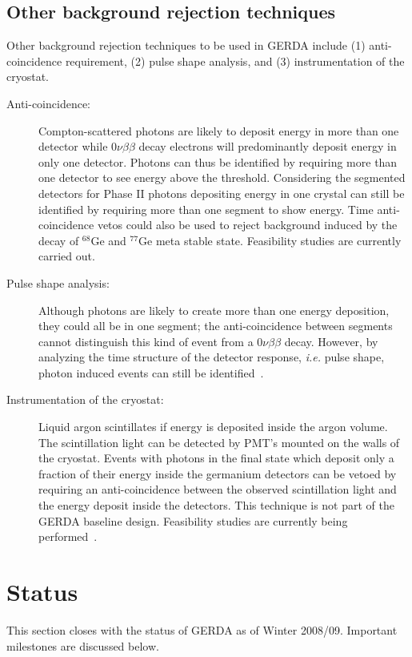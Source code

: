 \subsection{Other background rejection techniques}
\label{sec:gerda:anti}
Other background rejection techniques to be used in GERDA include (1) anti-coincidence requirement, (2) pulse shape analysis, and (3) instrumentation of the cryostat.
\begin{description}
\item[Anti-coincidence:] Compton-scattered photons are likely to   deposit energy in more than one detector while $0\nu\beta\beta$   decay electrons will predominantly deposit energy in only one   detector. Photons can thus be identified by requiring more than one   detector to see energy above the threshold. Considering the   segmented detectors for Phase II photons depositing energy in one   crystal can still be identified by requiring more than one segment   to show energy. Time anti-coincidence vetos could also be used to   reject background induced by the decay of $^{68}$Ge and $^{77}$Ge   meta stable state. Feasibility studies are currently carried out.
\item[Pulse shape analysis:] Although photons are likely to create   more than one energy deposition, they could all be in one segment;   the anti-coincidence between segments cannot distinguish this kind   of event from a $0\nu\beta\beta$ decay. However, by analyzing   the time structure of the detector response, \textit{i.e.} pulse   shape, photon induced events can still be identified~\cite{Kev07}.
\item[Instrumentation of the cryostat:] Liquid argon scintillates if   energy is deposited inside the argon volume. The scintillation light   can be detected by PMT's mounted on the walls of the cryostat.   Events with photons in the final state which deposit only a fraction   of their energy inside the germanium detectors can be vetoed by   requiring an anti-coincidence between the observed scintillation   light and the energy deposit inside the detectors.  This technique   is not part of the GERDA baseline design. Feasibility studies are   currently being performed~\cite{Pei05, Orr06}.
\end{description}

\section{Status}
\label{sec:gerda:stat}
This section closes with the status of GERDA as of Winter 2008/09. Important milestones are discussed below.  

